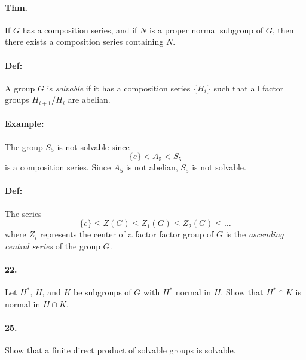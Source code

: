 \documentclass[10pt,a4paper]{article}
\begin{document}
\paragraph{Thm.} If $G$ has a composition series, and if $N$ is a proper normal subgroup of $G$, then there exists a composition series containing $N$.

\paragraph{Def:} A group $G$ is \textit{solvable} if it has a composition series $\{H_i\}$ such that all factor groups $H_{i+1}/H_i$ are abelian.

\paragraph{Example:} The group $S_5$ is not solvable since
$$ \{e\} < A_5 < S_5$$
is a composition series. Since $A_5$ is not abelian, $S_5$ is not solvable.

\paragraph{Def:} The series
$$ \{e\} \leq Z(G) \leq Z_1(G) \leq Z_2(G) \leq \dots$$
where $Z_i$ represents the center of a factor factor group of $G$ is the \textit{ascending central series} of the group $G$.

\paragraph{22.} Let $H^*$, $H$, and $K$ be subgroups of $G$ with $H^*$ normal in $H$. Show that $H^* \cap K$ is normal in $H \cap K$.

\paragraph{25.} Show that a finite direct product of solvable groups is solvable.
\end{document}
